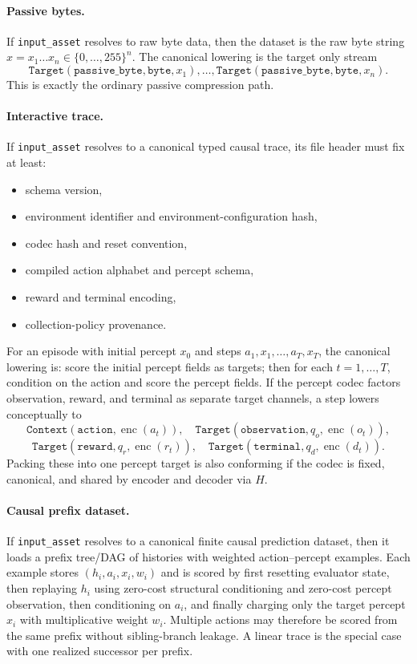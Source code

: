 \documentclass[11pt]{article}
\begin{document}
\paragraph{Passive bytes.}
If \texttt{input\_asset} resolves to raw byte data, then the dataset is the raw
byte string
$x=x_1\dots x_n\in\{0,\dots,255\}^{n}$. The canonical lowering is the target
only stream
\[
\texttt{Target}(\texttt{passive\_byte},\texttt{byte},x_1),\dots,
\texttt{Target}(\texttt{passive\_byte},\texttt{byte},x_n).
\]
This is exactly the ordinary passive compression path.

\paragraph{Interactive trace.}
If \texttt{input\_asset} resolves to a canonical typed causal trace, its file
header must
fix at least:
\begin{itemize}
    \item schema version,
    \item environment identifier and environment-configuration hash,
    \item codec hash and reset convention,
    \item compiled action alphabet and percept schema,
    \item reward and terminal encoding,
    \item collection-policy provenance.
\end{itemize}
For an episode with initial percept $x_0$ and steps
$a_1,x_1,\dots,a_T,x_T$, the canonical lowering is: score the initial percept
fields as targets; then for each $t=1,\dots,T$, condition on the action and
score the percept fields. If the percept codec factors observation, reward, and
terminal as separate target channels, a step lowers conceptually to
\[
\texttt{Context}(\texttt{action},\operatorname{enc}(a_t)),
\quad
\texttt{Target}(\texttt{observation},q_o,\operatorname{enc}(o_t)),
\]
\[
\texttt{Target}(\texttt{reward},q_r,\operatorname{enc}(r_t)),
\quad
\texttt{Target}(\texttt{terminal},q_d,\operatorname{enc}(d_t)).
\]
Packing these into one percept target is also conforming if the codec is fixed,
canonical, and shared by encoder and decoder via $H$.

\paragraph{Causal prefix dataset.}
If \texttt{input\_asset} resolves to a canonical finite causal prediction
dataset, then it loads a prefix tree/DAG of histories with weighted
action--percept examples. Each example stores $(h_i,a_i,x_i,w_i)$ and is
scored by first resetting evaluator state, then replaying $h_i$ using
zero-cost structural conditioning and zero-cost percept observation,
then conditioning on $a_i$, and finally charging only the target percept
$x_i$ with multiplicative weight $w_i$. Multiple actions may therefore be
scored from the same prefix without sibling-branch leakage. A linear trace is
the special case with one realized successor per prefix.
\end{document}
